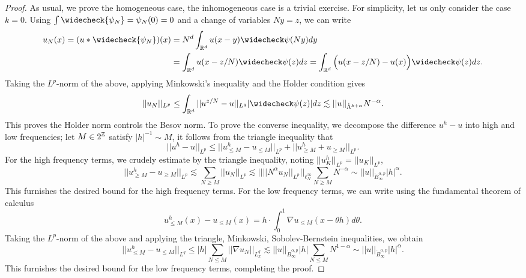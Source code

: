 \begin{proof}
	As usual, we prove the homogeneous case, the inhomogeneous case is a trivial exercise. For simplicity, let us only consider the case $k = 0$. Using $\int \widecheck{\psi_N} = \psi_N (0) = 0$ and a change of variables $Ny = z$, we can write
		\begin{align*}
			u_N (x) = (u * \widecheck{\psi_N})(x) 
				&= N^d \int_{\R^d} u(x - y) \widecheck\psi (Ny) dy \\
				&= \int_{\R^d} u(x - z/N) \widecheck \psi (z) dz = \int_{\R^d} \Big( u(x - z/N) - u(x)\Big) \widecheck \psi (z) dz.
		\end{align*}	
	Taking the $L^p$-norm of the above, applying Minkowski's inequality and the Holder condition gives
		\begin{align*}
			||u_N||_{L^p} \leq  \int_{\R^d} ||u^{z/N} - u||_{L^q} |\widecheck \psi (z)| dz \lesssim ||u||_{\dot \Lambda^{k + \alpha}} N^{-\alpha} . 
		\end{align*}
	This proves the Holder norm controls the Besov norm. To prove the converse inequality, we decompose the difference $u^h - u$ into high and low frequencies; let $M \in 2^\mathbb Z$ satisfy $ |h|^{-1} \sim M$, it follows from the triangle inequality that
		\[ || u^h - u||_{L^p} \leq ||u^h_{\leq M} - u_{\leq M} ||_{L^p} + ||u^h_{\geq M} + u_{\geq M} ||_{L^p}.  \]
	For the high frequency terms, we crudely estimate by the triangle inequality, noting $||u^h_{K}||_{L^p} = ||u_{K} ||_{L^p}$,
		\[ || u^h_{\geq M} - u_{\geq M} ||_{L^p} \lesssim \sum_{N\geq M} ||u_N||_{L^p} \lesssim \Big|\Big| ||N^{\alpha} u_N||_{L^p} \Big|\Big|_{\ell^\infty_N} \sum_{N \geq M} N^{-\alpha} \sim ||u||_{\dot B^{\alpha, p}_\infty} |h|^{\alpha} .\]	
	This furnishes the desired bound for the high frequency terms. For the low frequency terms, we can write using the fundamental theorem of calculus
		\[  u^h_{\leq M} (x) -  u_{\leq M} (x)  = h \cdot \int_0^1 \nabla u_{\leq M} (x - \theta h) d \theta. \]	
	Taking the $L^p$-norm of the above and applying the triangle, Minkowski, Sobolev-Bernstein inequalities, we obtain
		\[ ||u^h_{\leq M} - u_{\leq M} ||_{L^q} \leq |h| \sum_{N \leq M} ||\nabla u_{N}||_{L^q_x} \lesssim ||u||_{\dot B^{\alpha, p}_\infty} |h| \sum_{N \leq M} N^{1-\alpha} \sim   ||u||_{\dot B^{\alpha, p}_\infty} |h|^\alpha . \]	
	This furnishes the desired bound for the low frequency terms, completing the proof. 		
\end{proof}



